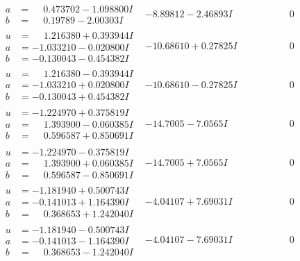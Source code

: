 \documentclass[1p]{elsarticle_modified}
\theoremstyle{definition}
\begin{document}
$$\begin{array}{c|c|c}
\begin{aligned}
a &= \phantom{-}0.473702 - 1.098800 I \\
b &= \phantom{-}0.19789 - 2.00303 I\end{aligned}
 & -8.89812 - 2.46893 I & \phantom{-0.000000 } 0 \\ \hline\begin{aligned}
u &= \phantom{-}1.216380 + 0.393944 I \\
a &= -1.033210 - 0.020800 I \\
b &= -0.130043 - 0.454382 I\end{aligned}
 & -10.68610 + 0.27825 I & \phantom{-0.000000 } 0 \\ \hline\begin{aligned}
u &= \phantom{-}1.216380 - 0.393944 I \\
a &= -1.033210 + 0.020800 I \\
b &= -0.130043 + 0.454382 I\end{aligned}
 & -10.68610 - 0.27825 I & \phantom{-0.000000 } 0 \\ \hline\begin{aligned}
u &= -1.224970 + 0.375819 I \\
a &= \phantom{-}1.393900 - 0.060385 I \\
b &= \phantom{-}0.596587 + 0.850691 I\end{aligned}
 & -14.7005 - 7.0565 I & \phantom{-0.000000 } 0 \\ \hline\begin{aligned}
u &= -1.224970 - 0.375819 I \\
a &= \phantom{-}1.393900 + 0.060385 I \\
b &= \phantom{-}0.596587 - 0.850691 I\end{aligned}
 & -14.7005 + 7.0565 I & \phantom{-0.000000 } 0 \\ \hline\begin{aligned}
u &= -1.181940 + 0.500743 I \\
a &= -0.141013 + 1.164390 I \\
b &= \phantom{-}0.368653 + 1.242040 I\end{aligned}
 & -4.04107 + 7.69031 I & \phantom{-0.000000 } 0 \\ \hline\begin{aligned}
u &= -1.181940 - 0.500743 I \\
a &= -0.141013 - 1.164390 I \\
b &= \phantom{-}0.368653 - 1.242040 I\end{aligned}
 & -4.04107 - 7.69031 I & \phantom{-0.000000 } 0\\

\end{array}$$
\end{document}
